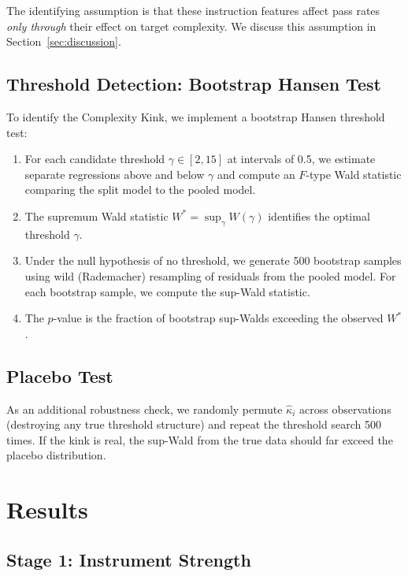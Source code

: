 \documentclass[conference]{IEEEtran}
\begin{document}
The identifying assumption is that these instruction features affect pass rates \emph{only through} their effect on target complexity. We discuss this assumption in Section~\ref{sec:discussion}.

\subsection{Threshold Detection: Bootstrap Hansen Test}

To identify the Complexity Kink, we implement a bootstrap Hansen threshold test:

\begin{enumerate}
    \item For each candidate threshold $\gamma \in [2, 15]$ at intervals of 0.5, we estimate separate regressions above and below $\gamma$ and compute an $F$-type Wald statistic comparing the split model to the pooled model.
    \item The supremum Wald statistic $W^* = \sup_\gamma W(\gamma)$ identifies the optimal threshold $\hat{\gamma}$.
    \item Under the null hypothesis of no threshold, we generate 500 bootstrap samples using wild (Rademacher) resampling of residuals from the pooled model. For each bootstrap sample, we compute the sup-Wald statistic.
    \item The $p$-value is the fraction of bootstrap sup-Walds exceeding the observed $W^*$.
\end{enumerate}

\subsection{Placebo Test}

As an additional robustness check, we randomly permute $\hat{\kappa}_i$ across observations (destroying any true threshold structure) and repeat the threshold search 500 times. If the kink is real, the sup-Wald from the true data should far exceed the placebo distribution.

\section{Results}
\label{sec:results}

\subsection{Stage 1: Instrument Strength}
\end{document}
